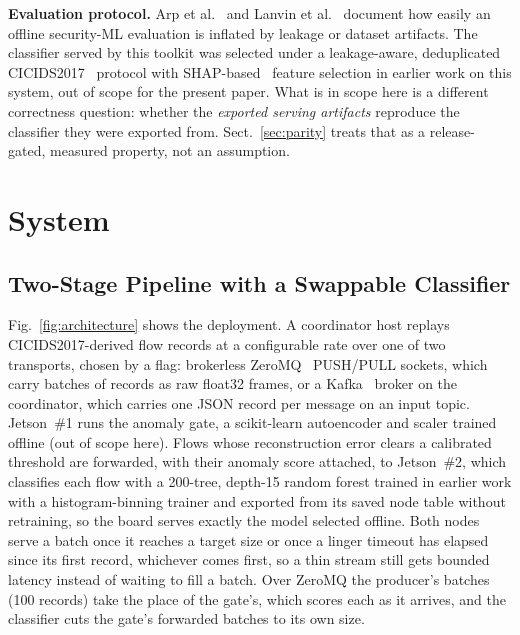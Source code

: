 \documentclass[runningheads]{llncs}
\begin{document}
\textbf{Evaluation protocol.} Arp et al.~\cite{arp2022dosdonts} and Lanvin et al.~\cite{lanvin2023errors} document how easily an offline security-ML evaluation is inflated by leakage or dataset artifacts. The classifier served by this toolkit was selected under a leakage-aware, deduplicated CICIDS2017~\cite{sharafaldin2018toward} protocol with SHAP-based~\cite{lundberg2017unified} feature selection in earlier work on this system, out of scope for the present paper. What is in scope here is a different correctness question: whether the \emph{exported serving artifacts} reproduce the classifier they were exported from. Sect.~\ref{sec:parity} treats that as a release-gated, measured property, not an assumption.

\section{System}
\label{sec:arch}

\subsection{Two-Stage Pipeline with a Swappable Classifier}

Fig.~\ref{fig:architecture} shows the deployment. A coordinator host replays CICIDS2017-derived flow records at a configurable rate over one of two transports, chosen by a flag: brokerless ZeroMQ~\cite{hintjens2013zeromq} PUSH/PULL sockets, which carry batches of records as raw float32 frames, or a Kafka~\cite{kreps2011kafka} broker on the coordinator, which carries one JSON record per message on an input topic. Jetson~\#1 runs the anomaly gate, a scikit-learn autoencoder and scaler trained offline (out of scope here). Flows whose reconstruction error clears a calibrated threshold are forwarded, with their anomaly score attached, to Jetson~\#2, which classifies each flow with a 200-tree, depth-15 random forest trained in earlier work with a histogram-binning trainer and exported from its saved node table without retraining, so the board serves exactly the model selected offline. Both nodes serve a batch once it reaches a target size or once a linger timeout has elapsed since its first record, whichever comes first, so a thin stream still gets bounded latency instead of waiting to fill a batch. Over ZeroMQ the producer's batches (100 records) take the place of the gate's, which scores each as it arrives, and the classifier cuts the gate's forwarded batches to its own size.
\end{document}
